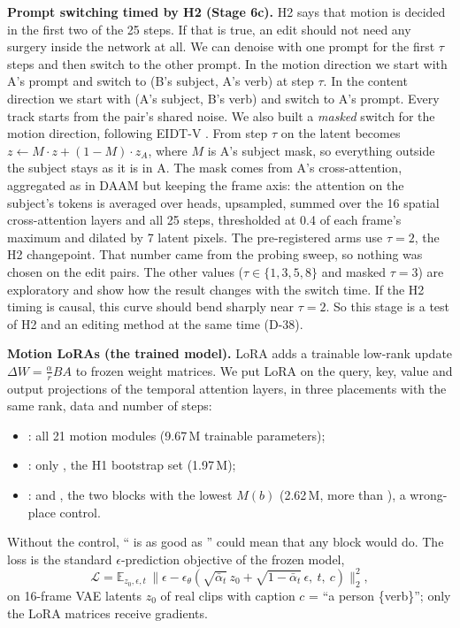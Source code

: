 \documentclass[twoside,english]{article}
\begin{document}
\textbf{Prompt switching timed by H2 (Stage 6c).} H2 says that motion is decided in the first two of
the 25 steps. If that is true, an edit should not need any surgery inside the network at all. We can
denoise with one prompt for the first $\tau$ steps and then switch to the other prompt. In the motion
direction we start with A's prompt and switch to (B's subject, A's verb) at step $\tau$. In the
content direction we start with (A's subject, B's verb) and switch to A's prompt. Every track starts
from the pair's shared noise. We also built a \emph{masked} switch for the motion direction,
following EIDT-V \citep{jagpal2025eidtv}. From step $\tau$ on the latent becomes
$z \leftarrow M\cdot z + (1-M)\cdot z_A$, where $M$ is A's subject mask, so everything outside the
subject stays as it is in A. The mask comes from A's cross-attention, aggregated as in DAAM
\citep{tang2023daam} but keeping the frame axis: the attention on the subject's tokens is averaged over
heads, upsampled, summed over the 16 spatial cross-attention layers and all 25 steps, thresholded at
0.4 of each frame's maximum and dilated by 7 latent pixels. The pre-registered arms use $\tau = 2$, the
H2 changepoint. That number came from the probing sweep, so nothing was chosen on the edit pairs.
The other values ($\tau \in \{1, 3, 5, 8\}$ and masked $\tau = 3$) are exploratory and show how the
result changes with the switch time. If the H2 timing is causal, this curve should bend sharply near
$\tau = 2$. So this stage is a test of H2 and an editing method at the same time (D-38).

\textbf{Motion LoRAs (the trained model).} LoRA \citep{hu2022lora} adds a trainable low-rank update
$\Delta W = \frac{\alpha}{r}BA$ to frozen weight matrices. We put LoRA on the query, key, value and
output projections of the temporal attention layers, in three placements with the same rank,
data and number of steps:
\begin{itemize}
\item {}: all 21 motion modules (9.67\,M trainable parameters);
\item {}: only , the H1 bootstrap set (1.97\,M);
\item {}:  and , the two blocks with the lowest $M(b)$
  (2.62\,M, more than ), a wrong-place control.
\end{itemize}
Without the control, `` is as good as '' could mean that any block would do.
The loss is the standard $\epsilon$-prediction objective of the frozen model,
\begin{equation}
\mathcal{L} = \mathbb{E}_{z_0, \epsilon, t}\,\big\| \epsilon - \epsilon_\theta(\sqrt{\bar\alpha_t}\,z_0 + \sqrt{1-\bar\alpha_t}\,\epsilon,\ t,\ c) \big\|_2^2,
\end{equation}
on 16-frame VAE latents $z_0$ of real clips with caption $c$ = ``a person \{verb\}''; only the LoRA
matrices receive gradients.
\end{document}
